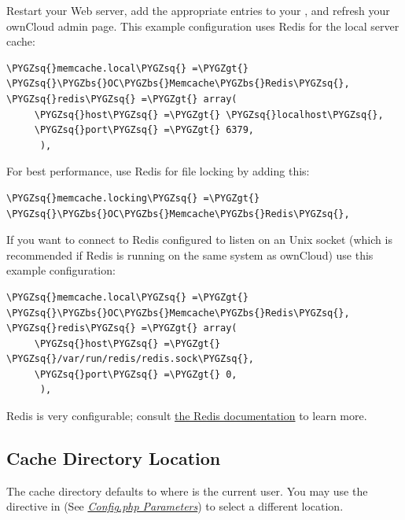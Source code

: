 \documentclass[letterpaper,10pt,english]{sphinxmanual}
\def\PYGZbs{\char`\\}
\def\PYGZgt{\char`\>}
\def\PYGZsq{\char`\'}
\begin{document}
Restart your Web server, add the appropriate entries to your , and
refresh your ownCloud admin page. This example  configuration uses
Redis for the local server cache:

\begin{Verbatim}[commandchars=\\\{\}]
\PYGZsq{}memcache.local\PYGZsq{} =\PYGZgt{} \PYGZsq{}\PYGZbs{}OC\PYGZbs{}Memcache\PYGZbs{}Redis\PYGZsq{},
\PYGZsq{}redis\PYGZsq{} =\PYGZgt{} array(
     \PYGZsq{}host\PYGZsq{} =\PYGZgt{} \PYGZsq{}localhost\PYGZsq{},
     \PYGZsq{}port\PYGZsq{} =\PYGZgt{} 6379,
      ),
\end{Verbatim}

For best performance, use Redis for file locking by adding this:

\begin{Verbatim}[commandchars=\\\{\}]
\PYGZsq{}memcache.locking\PYGZsq{} =\PYGZgt{} \PYGZsq{}\PYGZbs{}OC\PYGZbs{}Memcache\PYGZbs{}Redis\PYGZsq{},
\end{Verbatim}

If you want to connect to Redis configured to listen on an Unix socket (which is
recommended if Redis is running on the same system as ownCloud) use this example
 configuration:

\begin{Verbatim}[commandchars=\\\{\}]
\PYGZsq{}memcache.local\PYGZsq{} =\PYGZgt{} \PYGZsq{}\PYGZbs{}OC\PYGZbs{}Memcache\PYGZbs{}Redis\PYGZsq{},
\PYGZsq{}redis\PYGZsq{} =\PYGZgt{} array(
     \PYGZsq{}host\PYGZsq{} =\PYGZgt{} \PYGZsq{}/var/run/redis/redis.sock\PYGZsq{},
     \PYGZsq{}port\PYGZsq{} =\PYGZgt{} 0,
      ),
\end{Verbatim}

Redis is very configurable; consult \href{http://redis.io/documentation}{the Redis documentation} to learn more.


\subsection{Cache Directory Location}
\label{configuration_server/caching_configuration:cache-directory-location}
The cache directory defaults to  where  is the
current user. You may use the  directive in 
(See {\hyperref[configuration_server/config_sample_php_parameters::doc]{\emph{Config.php Parameters}}}) to select a different location.
\end{document}
